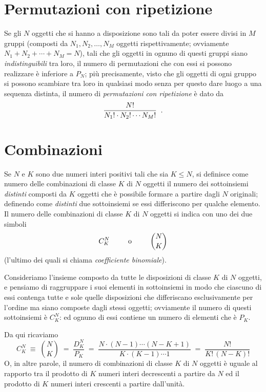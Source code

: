 \section{Permutazioni con ripetizione}%
Se gli $N$ oggetti che si hanno a disposizione sono tali da
poter essere divisi in $M$ gruppi (composti da $N_1,
N_2,\ldots,N_M$ oggetti rispettivamente; ovviamente $N_1 +
N_2 + \cdots+N_M = N$), tali che gli oggetti in ognuno di
questi gruppi siano \emph{indistinguibili} tra loro, il
numero di permutazioni che con essi si possono realizzare
\`e inferiore a $P_N$; pi\`u precisamente, visto che gli
oggetti di ogni gruppo si possono scambiare tra loro in
qualsiasi modo senza per questo dare luogo a una sequenza
distinta, il numero di \emph{permutazioni con ripetizione}
\`e dato da
\begin{equation} \label{eq:a.perip}
  \frac{N!}{N_1! \cdot N_2! \cdots N_M!} \;\; .
\end{equation}%

\section{Combinazioni}%
%
\label{ch:a.combina}
Se $N$ e $K$ sono due numeri interi positivi tali che sia $K
\le N$, si definisce come numero delle combinazioni di
classe $K$ di $N$ oggetti il numero dei sottoinsiemi
\emph{distinti} composti da $K$ oggetti che \`e possibile
formare a partire dagli $N$ originali; definendo come
\emph{distinti} due sottoinsiemi se essi differiscono per
qualche elemento.  Il numero delle combinazioni di classe
$K$ di $N$ oggetti si indica con uno dei due simboli
\begin{equation*}
  C^N_K \makebox[20mm]{o} \binom{N}{K}
\end{equation*}%
(l'ultimo dei quali si chiama \emph{coefficiente
  binomiale}).

Consideriamo l'insieme composto da tutte le disposizioni di
classe $K$ di $N$ oggetti, e pensiamo di raggruppare i suoi
elementi in sottoinsiemi in modo che ciascuno di essi
contenga tutte e sole quelle disposizioni che differiscano
esclusivamente per l'ordine ma siano composte dagli stessi
oggetti; ovviamente il numero di questi sottoinsiemi \`e
$C^N_K$: ed ognuno di essi contiene un numero di elementi
che \`e $P_K$.

Da qui ricaviamo
\begin{equation} \label{eq:a.binom}
  C^N_K \; \equiv \; \binom{N}{K} \; = \;
    \frac{D^N_K}{P_K} \; = \;
    \frac{N \cdot (N-1) \cdots (N-K+1)}{K \cdot (K-1)
    \cdots 1} \; = \; \frac{N!}{K! \, (N-K)!}
\end{equation}
O, in altre parole, il numero di combinazioni di classe $K$
di $N$ oggetti \`e uguale al rapporto tra il prodotto di $K$
numeri interi decrescenti a partire da $N$ ed il prodotto di
$K$ numeri interi crescenti a partire dall'unit\`a.

